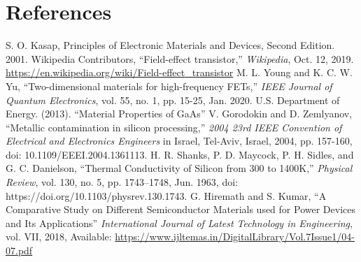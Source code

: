 \documentclass[conference]{IEEEtran}
\begin{document}
\section*{References}

\begin{thebibliography}{00}
   S. O. Kasap, Principles of Electronic Materials and Devices, Second Edition. 2001.
   Wikipedia Contributors, ``Field-effect transistor,'' \textit{Wikipedia}, Oct. 12, 2019. \href{https://en.wikipedia.org/wiki/Field-effect\_transistor}{https://en.wikipedia.org/wiki/Field-effect\_transistor}
   M. L. Young and K. C. W. Yu, ``Two-dimensional materials for high-frequency FETs,'' \textit{IEEE Journal of Quantum Electronics}, vol. 55, no. 1, pp. 15-25, Jan. 2020.
   U.S. Department of Energy. (2013). ``Material Properties of GaAs'' 
   V. Gorodokin and D. Zemlyanov, ``Metallic contamination in silicon processing,'' \textit{2004 23rd IEEE Convention of Electrical and Electronics Engineers} in Israel, Tel-Aviv, Israel, 2004, pp. 157-160, doi: 10.1109/EEEI.2004.1361113.
   H. R. Shanks, P. D. Maycock, P. H. Sidles, and G. C. Danielson, ``Thermal Conductivity of Silicon from 300 to 1400K,'' \textit{Physical Review}, vol. 130, no. 5, pp. 1743–1748, Jun. 1963, doi: https://doi.org/10.1103/physrev.130.1743.
   G. Hiremath and S. Kumar, ``A Comparative Study on Different Semiconductor Materials used for Power Devices and Its Applications'' \textit{International Journal of Latest Technology in Engineering}, vol. VII, 2018, Available: \href{https://www.ijltemas.in/DigitalLibrary/Vol.7Issue1/04-07.pdf}{https://www.ijltemas.in/DigitalLibrary/Vol.7Issue1/04-07.pdf}

‌
\end{thebibliography}
\end{document}
